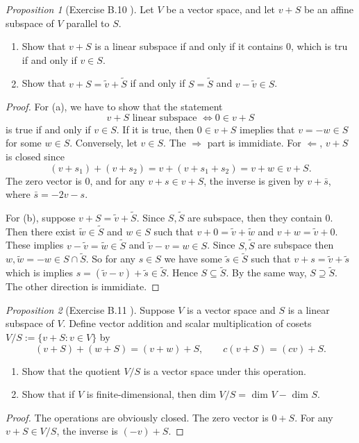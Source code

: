 \documentclass[a4paper]{article}
\theoremstyle{remark}
\newtheorem{prop}{Proposition}
\newcommand{\subhim}{\subseteq} %
\begin{document}
\begin{prop}[Exercise B.10 \cite{LeeSM}]
	Let $V$ be a vector space, and let $v+S$ be an affine subspace of $V$ parallel to $S$.
	\begin{enumerate}[nolistsep]
		\item [(a)] Show that $v+S$ is a linear subspace if and only if it contains $0$, which is tru if and only if $v\in S$.
		\item [(b)] Show that $v+S = \tilde{v}+\tilde{S}$ if and only if $S=\tilde{S}$ and $v-\tilde{v} \in S$.
	\end{enumerate}
\end{prop}
\begin{proof}
	For (a), we have to show that the statement 
	$$
	v+S \text{ linear subspace } \Leftrightarrow 0 \in v+S
	$$
	is true if and only if $v \in S$. If it is true, then $0 \in v+S$ imeplies that $v = -w \in S$ for some $w \in S$. Conversely, let $v \in S$. The $\Rightarrow$ part is immidiate. For $\Leftarrow$, $v+S$ is closed since 
	$$
	(v+s_1) + (v+s_2) = v + (v+s_1+s_2) = v+ w \in v+S.
	$$
	The zero vector is $0$, and for any $v+s \in v+ S$, the inverse is given by $v+\bar{s}$, where $\bar{s} = -2v - s$.
	
	For (b), suppose $v+ S = \tilde{v} + \tilde{S}$. Since $S,\tilde{S}$ are subspace, then they contain $0$. Then there exist $\tilde{w} \in \tilde{S}$ and $w \in S$ such that $v+0 = \tilde{v} + \tilde{w}$ and $v+w = \tilde{v}+ 0 $. These implies $v-\tilde{v} = \tilde{w} \in \tilde{S}$ and $\tilde{v} - v = w \in S$. Since $S,\tilde{S}$ are subspace then $w,\tilde{w}=-w \in S \cap \tilde{S}$. So for any $s \in S$ we have some $\tilde{s} \in \tilde{S}$ such that
	$v + s = \tilde{v} + \tilde{s}$ which is implies $s = (\tilde{v} - v) + \tilde{s} \in \tilde{S}$. Hence $S \subhim \tilde{S}$. By the same way, $S \supseteq \tilde{S}$. The other direction is immidiate.
\end{proof}

\begin{prop}[Exercise B.11 \cite{LeeSM}]
Suppose $V$ is a vector space and $S$ is a linear subspace of $V$. Define vector addition and scalar multiplication of cosets $V/S:= \{v+S : v \in V\}$ by
$$
(v+S)+(w+S) = (v+w)+S, \qquad c(v+S) = (cv)+S.
$$	
\begin{enumerate}[nolistsep]
	\item [(a)] Show that the quotient $V/S$ is a vector space under this operation.
	\item [(b)] Show that if $V$ is finite-dimensional, then $\text{dim }V/S = \text{ dim }V - \text{ dim }S$.
\end{enumerate}
\end{prop}
\begin{proof}
	The operations are obviously closed. The zero vector is $0+S$. For any $v+S \in V/S$, the inverse is $(-v)+S$.
\end{proof}
\end{document}
